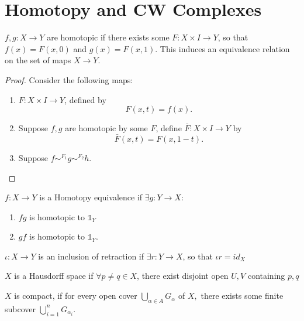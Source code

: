 \documentclass{article}
\begin{document}
\setcounter{section}{-1}

\section{Homotopy and CW Complexes}

    \begin{defn}
    $ f,g:X\to Y $ are homotopic if there exists some $ F:X\times I\to Y $, so that $ f(x)=F(x,0) $ and $ g(x)=F(x,1)  $. This induces an equivalence relation on the set of maps $ X\to Y $.
    \begin{proof} 
        Consider the following maps:
        \begin{enumerate}
            \item $ F:X\times I\to Y $, defined by 
                \[
                F(x,t)=f(x)
                .\] 
            \item Suppose $ f,g $ are homotopic by some $ F $, define $ \bar{F}:X\times I\to Y $ by 
                \[
                \bar{F}(x,t)=F(x,1-t)
                .\] 
            \item Suppose $ f\sim ^{F_1}g\sim ^{F_2} h$.
        \end{enumerate}
    \end{proof}
\end{defn}
\begin{defn}
    $ f:X\to Y $ is a Homotopy equivalence if $ \exists g:Y\to X $:
    \begin{enumerate}
        \item $ fg $ is homotopic to $ \mathbb{1}_Y$ 
        \item $ gf $ is homotopic to $ \mathbb{1}_Y $.
    \end{enumerate}
\end{defn}
\begin{defn}
    $ \iota:X\to Y $ is an inclusion of retraction if $\exists r:Y\to X $, so that $ \iota r=id_X $
\end{defn}

\begin{defn}
    $ X $ is a Hausdorff space if $ \forall p\neq q\in X $, there exist disjoint open $ U,V $ containing $ p,q $
\end{defn}
\begin{defn}
    $ X  $ is compact, if for every open cover $ \bigcup_{\alpha\in A} G_\alpha $ of $ X, $ there exists some finite subcover $ \bigcup_{i=1} ^{n}G_{\alpha_i} $.
\end{defn}
\end{document}
